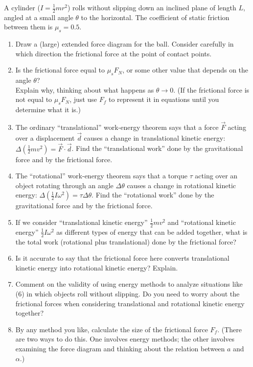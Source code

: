 \documentclass[12pt]{article}
\begin{document}
\begin{enumerate}
A cylinder ($I=\frac{1}{2} mr^2$) rolls without slipping down an inclined plane of length $L$, angled at a small angle $\theta$ to the horizontal. The
coefficient of static friction between them is $\mu_s=0.5$.

\begin{enumerate}
	
	\item Draw a (large) extended force diagram for the ball. Consider carefully in which direction the frictional force at the point of contact points.
	\item Is the frictional force equal to $\mu_s F_N$, or some other value that depends on the angle $\theta$? \\ Explain why, thinking about what happens as $\theta \rightarrow 0$.
	(If the frictional force is not equal to $\mu_s F_N$, just use $F_f$ to represent it in equations until you determine what it is.)
	\item The ordinary ``translational'' work-energy theorem says that a force $\vec F$ acting over a displacement $\vec d$ causes a change in translational kinetic energy:
	$\Delta (\frac{1}{2}mv^2) = \vec F \cdot \vec d$.
	Find the ``translational work'' done by the gravitational force and by the frictional force.
	\item The ``rotational'' work-energy theorem says that a torque $\tau $ acting over an object rotating through an angle $\Delta \theta$ causes a change in rotational kinetic energy: $\Delta (\frac{1}{2}I\omega^2) = \tau \Delta \theta$.
	Find the ``rotational work'' done by the gravitational force and by the frictional force.
	\item If we consider ``translational kinetic energy'' $\frac{1}{2}mv^2$ and ``rotational kinetic energy'' $\frac{1}{2}I\omega^2$ as different types of energy that can be added together, what is the total
	work (rotational plus translational) done by the frictional force?
	\item Is it accurate to say that the frictional force here converts translational kinetic energy into rotational kinetic energy? Explain.
	\item Comment on the validity of using energy methods to analyze situations like (6) in which objects roll without slipping. Do you need to worry about the frictional forces when considering translational and rotational kinetic energy together?
	\item By any method you like, calculate the size of the frictional force $F_f$. (There are two ways to do this. One involves energy methods; the other involves
	examining the force diagram and thinking about the relation between $a$ and $\alpha$.)
\end{enumerate}
 


\end{enumerate}
\end{document}

